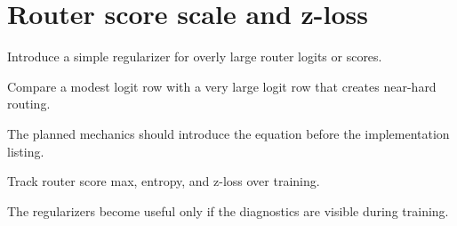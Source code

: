 \section{Router score scale and z-loss}
\label{sec:ch07-router-score-scale-and-z-loss}

Introduce a simple regularizer for overly large router logits or scores.



Compare a modest logit row with a very large logit row that creates near-hard routing.



The planned mechanics should introduce the equation before the implementation listing.





\begin{checkpointbox}
Track router score max, entropy, and z-loss over training.
\end{checkpointbox}

The regularizers become useful only if the diagnostics are visible during training.
